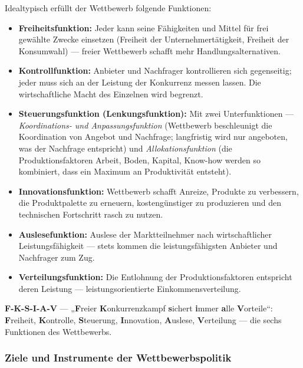 \documentclass[11pt, a4paper]{article}
\begin{document}
Idealtypisch erfüllt der Wettbewerb folgende Funktionen:

\begin{itemize}
  \item \textbf{Freiheitsfunktion:} Jeder kann seine Fähigkeiten und Mittel für frei
    gewählte Zwecke einsetzen (Freiheit der Unternehmertätigkeit, Freiheit der
    Konsumwahl) --- freier Wettbewerb schafft mehr Handlungsalternativen.
  \item \textbf{Kontrollfunktion:} Anbieter und Nachfrager kontrollieren sich gegenseitig;
    jeder muss sich an der Leistung der Konkurrenz messen lassen. Die wirtschaftliche
    Macht des Einzelnen wird begrenzt.
  \item \textbf{Steuerungsfunktion (Lenkungsfunktion):} Mit zwei Unterfunktionen ---
    \emph{Koordinations- und Anpassungsfunktion} (Wettbewerb beschleunigt die Koordination
    von Angebot und Nachfrage; langfristig wird nur angeboten, was der Nachfrage
    entspricht) und \emph{Allokationsfunktion} (die Produktionsfaktoren Arbeit, Boden,
    Kapital, Know-how werden so kombiniert, dass ein Maximum an Produktivität entsteht).
  \item \textbf{Innovationsfunktion:} Wettbewerb schafft Anreize, Produkte zu verbessern,
    die Produktpalette zu erneuern, kostengünstiger zu produzieren und den technischen
    Fortschritt rasch zu nutzen.
  \item \textbf{Auslesefunktion:} Auslese der Marktteilnehmer nach wirtschaftlicher
    Leistungsfähigkeit --- stets kommen die leistungsfähigsten Anbieter und Nachfrager
    zum Zug.
  \item \textbf{Verteilungsfunktion:} Die Entlohnung der Produktionsfaktoren entspricht
    deren Leistung --- leistungsorientierte Einkommensverteilung.
\end{itemize}

\begin{eselsbruecke}
\textbf{F-K-S-I-A-V} --- „\textbf{F}reier \textbf{K}onkurrenzkampf \textbf{s}ichert
\textbf{i}mmer \textbf{a}lle \textbf{V}orteile``: \textbf{F}reiheit, \textbf{K}ontrolle,
\textbf{S}teuerung, \textbf{I}nnovation, \textbf{A}uslese, \textbf{V}erteilung ---
die sechs Funktionen des Wettbewerbs.
\end{eselsbruecke}

\subsubsection{Ziele und Instrumente der Wettbewerbspolitik}
\end{document}
